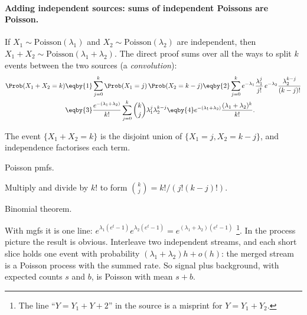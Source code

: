 \paragraph{Adding independent sources: sums of independent Poissons are Poisson.} If $X_1\sim\mathrm{Poisson}(\lambda_1)$ and $X_2\sim\mathrm{Poisson}(\lambda_2)$ are independent, then $X_1+X_2\sim\mathrm{Poisson}(\lambda_1+\lambda_2)$.
The direct proof sums over all the ways to split $k$ events between the two sources (a \emph{convolution}):
\begin{align*}
  \Prob(X_1+X_2=k)
  &\eqby{1} \sum_{j=0}^k\Prob(X_1=j)\,\Prob(X_2=k-j)
  \eqby{2} \sum_{j=0}^k e^{-\lambda_1}\frac{\lambda_1^j}{j!}\,e^{-\lambda_2}\frac{\lambda_2^{k-j}}{(k-j)!}\\
  &\eqby{3} \frac{e^{-(\lambda_1+\lambda_2)}}{k!}\sum_{j=0}^k\binom kj\lambda_1^j\lambda_2^{k-j}
  \eqby{4} e^{-(\lambda_1+\lambda_2)}\frac{(\lambda_1+\lambda_2)^k}{k!}.
\end{align*}
\begin{explain}
  \item The event $\{X_1+X_2=k\}$ is the disjoint union of $\{X_1=j,X_2=k-j\}$, and independence factorises each term.
  \item Poisson pmfs.
  \item Multiply and divide by $k!$ to form $\binom kj=k!/(j!(k-j)!)$.
  \item Binomial theorem.
\end{explain}
With mgfs it is one line: $e^{\lambda_1(e^t-1)}e^{\lambda_2(e^t-1)}=e^{(\lambda_1+\lambda_2)(e^t-1)}$ \footnote{The line ``$Y=Y_1+Y+2$'' in the source is a misprint for $Y=Y_1+Y_2$.}. In the process picture the result is obvious. Interleave two independent streams, and each short slice holds one event with probability $(\lambda_1+\lambda_2)h+o(h)$: the merged stream is a Poisson process with the summed rate. So signal plus background, with expected counts $s$ and $b$, is Poisson with mean $s+b$.

